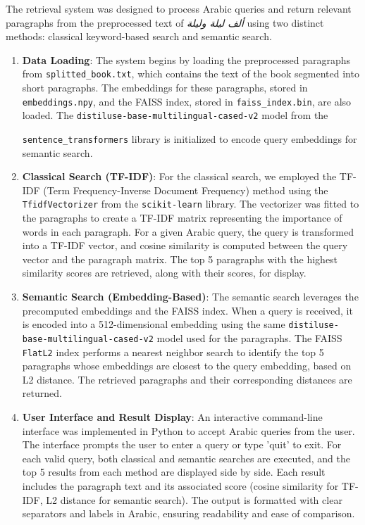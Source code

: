 \documentclass[12pt]{article}
\begin{document}
The retrieval system was designed to process Arabic queries and return relevant paragraphs from the preprocessed text of \textit{ألف ليلة وليلة} using two distinct methods: classical keyword-based search and semantic search. 

\begin{enumerate}
    \item \textbf{Data Loading}: The system begins by loading the preprocessed paragraphs from \texttt{splitted\_book.txt}, which contains the text of the book segmented into short paragraphs. The embeddings for these paragraphs, stored in \texttt{embeddings.npy}, and the FAISS index, stored in \texttt{faiss\_index.bin}, are also loaded. The \texttt{distiluse-base-multilingual-cased-v2} model from the 
    
    \texttt{sentence\_transformers} library is initialized to encode query embeddings for semantic search.
    
    \item \textbf{Classical Search (TF-IDF)}: For the classical search, we employed the TF-IDF (Term Frequency-Inverse Document Frequency) method using the \texttt{TfidfVectorizer} from the \texttt{scikit-learn} library. The vectorizer was fitted to the paragraphs to create a TF-IDF matrix representing the importance of words in each paragraph. For a given Arabic query, the query is transformed into a TF-IDF vector, and cosine similarity is computed between the query vector and the paragraph matrix. The top 5 paragraphs with the highest similarity scores are retrieved, along with their scores, for display.
    
    \item \textbf{Semantic Search (Embedding-Based)}: The semantic search leverages the precomputed embeddings and the FAISS index. When a query is received, it is encoded into a 512-dimensional embedding using the same \texttt{distiluse-base-multilingual-cased-v2} model used for the paragraphs. The FAISS \texttt{FlatL2} index performs a nearest neighbor search to identify the top 5 paragraphs whose embeddings are closest to the query embedding, based on L2 distance. The retrieved paragraphs and their corresponding distances are returned.
    
    \item \textbf{User Interface and Result Display}: An interactive command-line interface was implemented in Python to accept Arabic queries from the user. The interface prompts the user to enter a query or type 'quit' to exit. For each valid query, both classical and semantic searches are executed, and the top 5 results from each method are displayed side by side. Each result includes the paragraph text and its associated score (cosine similarity for TF-IDF, L2 distance for semantic search). The output is formatted with clear separators and labels in Arabic, ensuring readability and ease of comparison.
\end{enumerate}
\end{document}
